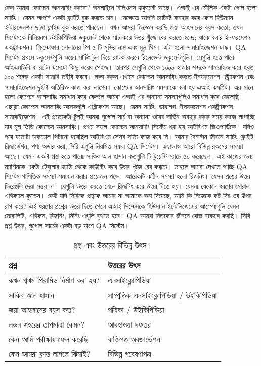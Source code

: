 কেন আমরা কোশ্চেন আনসারিং করবো? অনলাইনে বিলিওনস ডকুমেন্ট আছে। এআই এর মৌলিক একটা গোল হলো সার্চিং।  যেমন আপনি একটা ফ্লাইট বুক করতে চান। সেক্ষেত্রে আপনি চ্যাটবট ব্যবহার করে কোন হিউম্যান ইন্টারভেনশন ছাড়া ফ্লাইট বুক করতে পারছেন। যখন আমরা জিজ্ঞেস করছি জয়া আহসানের বয়স কতো; তখন সিস্টেমকে বিলিয়নস উইকিপিডিয়া ডকুমেন্ট থেকে সার্চ করে উত্তর খুঁজে বের করতে হচ্ছে; যাকে বলার ইনফরমেশন একট্র্যাকশন। ক্রিস্টোফার নোলানের টপ ৫ টি মুভির নাম এবং মূল থিম। এটা হলো সামারাইজেশন টাস্ক। QA সিস্টেম প্রথমে ডকুমেন্টগুলি ওয়েব সার্চিং টুল দিয়ে র‍্যাংক করবে রিলেভেন্ট ডকুমেন্টগুলি। সেগুলি হতে পারে আইএমডিবি বা রটেন টমেটো কিছু ওয়েব পেইজ। তারপর সেগুলি থেকে ১০০০ হাজার শব্দকে সামারাইজ করে হয়ত ১০০ শব্দের একটা সামারি তইরি করবে। লক্ষ্য করুন এখানে কোশ্চেন আনসারিং করতে ইনফরমেশন এক্ট্র্যাকশন এবং সামারাইজেশন দুইটা অতিরিক্ত কাজ করা লাগেব। কোশ্চেন আনসারিং সমস্যাকে বলা হয় এআই-কমপ্লিট। এর মানে হলো কোশ্চেন আনসারিং সমাধান করে ফেললে আমরা এআই এর অন্যান্য সমস্যাগুলিও সমাধান করে ফেলেছি। এছাড়া কোশ্চেন আনসারিং অনেকগুলি এপ্লিকেশন আছে। যেমন সার্চিং, ডায়ালগ, ইনফরমেশন একট্র্যাকশন, সামারাইজেশন। এই প্রত্যেকটা টুলই আমরা গুগোল সার্চ বা অন্যান্য ওয়েব সার্ভিব ব্যবহার করার সময় কাজে লাগাচ্ছি  যার মূল ভিত্তি কোশ্চেন আনসারিং। প্রথম সফল কোশ্চেন আনসারিং সিস্টেম ধরা হয় আইবিএম জিওপার্ডিকে। যদিও পরে যতোটা ঢাকঢোল পিটানো হয়েছিল আইবিএম সেসব সত্যি কাজ করে নি। আমার দৈনন্দিন জীবনে সার্চিং, ফ্লাইট রিজার্ভেশন, পণ্য অর্ডার করা, সিরি এগুলি নিয়মিত সফল QA সিস্টেম। এছাড়াও আরো বিভিন্ন রকমের সমস্যা আছে। যেমন একটা প্রশ্ন হতে পারেঃ সাকিব আল হাসান কতগুলি টি টুয়েন্টি ম্যাচে ৫০ করেছেন। এই কাজের জন্য ম্যাশিনকে একটা টেব্যুলার ড্যাটা থেকে কাউন্টিং করে উত্তর খুঁজে বের করতে। তাহলে আমরা দেখতে পাচ্ছি QA সিস্টেম গাণিতিক সমস্যা সমাধান করার প্রয়োজন পড়ে। আরেকটি কঠিন সমস্যা হলো রিজনিং। যেসব প্রশ্নের উত্তর ডিরেক্টলি দেয়া সম্ভব না। যেগুলি উত্তর করতে গেলে রিজনিং করে উত্তর দিতে হয়। যেমনঃ যেকোন ধরণের মোরাল এথিক্যাল কুশ্চেন। কেউ যদি সিরিকে প্রশ্নকে আমার মা আমাকে বকা দিয়েছে, আমি কি নিজেকে কষ্ট দিব ওর উপর রাগ করে? এই ধরণের প্রশ্নের উত্তর দিতে গেলে এআই সিস্টেমকে হিউম্যান ইন্টেলিজেন্সের আস্পেক্টগুলি যেমন মোরালিটি, এথিকস, রিজনিং, মিনিং এগুলি বুঝতে হবে। QA আমরা নিত্যকার জীবনে রোজ ব্যবহার করছি।  সিরি প্রশ্ন উত্তর, গুগোল সার্চের একটা বড় অংশ QA সিস্টেম। 


\begin{table}[!ht]
\begin{tabular}{  p{15em}  p{10cm}} 
  \toprule
  প্রশ্ন & উত্তরের উৎস \\
  \bottomrule
  কখন প্রথম পিরামিড নির্মাণ করা হয়?  & এনসাইক্লোপিডিয়া \\ 
  \hline
  সাকিব আল হাসান & সাম্প্রতিক এনসাইক্লোপিডিয়া / উইকিপিডিয়া \\ 
  \hline
  জয়া আহসানের বয়স কত?  &  পত্রিকা / উইকিপিডিয়া \\ 
  \hline
  লন্ডন শহরের তাপমাত্রা কেমন? & আবহাওয়া দফতর  \\ 
  \hline
  কেন আমি পরীক্ষায় ফেল করেছি & ব্যক্তিগত অবজার্ভেশন \\  
  কেন আমরা ক্লান্ত লাগলে ঝিমাই? &  বিভিন্ন গবেষণাপত্র  \\ 
  \bottomrule
\end{tabular}
\caption{প্রশ্ন এবং উত্তরের বিভিন্ন উৎস।}
\end{table}

